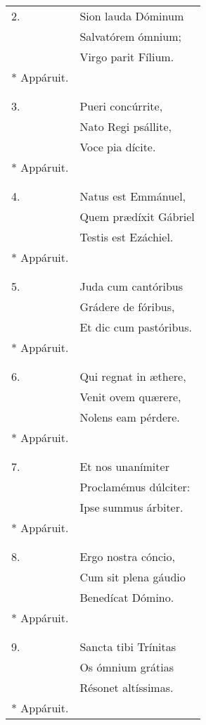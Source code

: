 \begin{longtable}{ll}
2. &Sion lauda Dóminum\\
&Salvatórem ómnium;\\
&Virgo parit Fílium.\\
* Appáruit.\\
\\\\
3. &Pueri concúrrite,\\
&Nato Regi psállite,\\
&Voce pia dícite.\\
* Appáruit.\\
\\\\
4. &Natus est Emmánuel,\\
&Quem prædíxit Gábriel\\
&Testis est Ezáchiel.\\
* Appáruit.\\
\\\\
5. &Juda cum cantóribus\\
&Grádere de fóribus,\\
&Et dic cum pastóribus.\\
* Appáruit.\\
\\\\
6. &Qui regnat in æthere,\\
&Venit ovem quærere,\\
&Nolens eam pérdere.\\
* Appáruit.\\
\\\\
7. &Et nos unanímiter\\
&Proclamémus dúlciter:\\
&Ipse summus árbiter.\\
* Appáruit.\\
\\\\
8. &Ergo nostra cóncio,\\
&Cum sit plena gáudio\\
&Benedícat Dómino.\\
* Appáruit.\\
\\\\
9. &Sancta tibi Trínitas\\
&Os ómnium grátias\\
&Résonet altíssimas.\\
* Appáruit.
\end{longtable}
